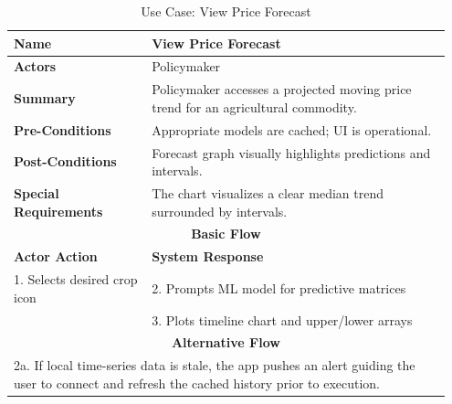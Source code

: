 \begin{table}[htbp]
  \centering
  \caption{Use Case: View Price Forecast}
  \label{uc:view_forecast}
  \begin{tabular}{|p{0.3\linewidth}|p{0.65\linewidth}|}
    \hline
    \textbf{Name} & View Price Forecast \\
    \hline
    \textbf{Actors} & Policymaker \\
    \hline
    \textbf{Summary} & Policymaker accesses a projected moving price trend for an agricultural commodity. \\
    \hline
    \textbf{Pre-Conditions} & Appropriate models are cached; UI is operational. \\
    \hline
    \textbf{Post-Conditions} & Forecast graph visually highlights predictions and intervals. \\
    \hline
    \textbf{Special Requirements} & The chart visualizes a clear median trend surrounded by intervals. \\
    \hline
    \multicolumn{2}{|c|}{\textbf{Basic Flow}} \\
    \hline
    \textbf{Actor Action} & \textbf{System Response} \\
    \hline
    1. Selects desired crop icon & 2. Prompts ML model for predictive matrices \\
    & 3. Plots timeline chart and upper/lower arrays \\
    \hline
    \multicolumn{2}{|c|}{\textbf{Alternative Flow}} \\
    \hline
    \multicolumn{2}{|p{0.95\linewidth}|}{2a. If local time-series data is stale, the app pushes an alert guiding the user to connect and refresh the cached history prior to execution.} \\
    \hline
  \end{tabular}
\end{table}

